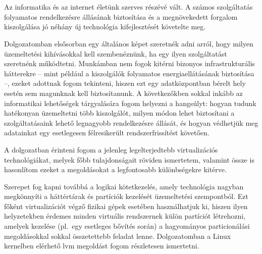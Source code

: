\chapter{\bevezetes}

%

Az informatika és az internet életünk szerves részévé vált. A számos szolgáltatás folyamatos rendelkezésre állásának biztosítása és a megnövekedett forgalom kiszolgálása jó néhány új technológia kifejlesztését követelte meg.

Dolgozatomban elsősorban egy általános képet szeretnék adni arról, hogy milyen üzemeltetési kihívásokkal kell szembenéznünk, ha egy ilyen szolgáltatást szeretnénk működtetni. Munkámban nem fogok kitérni bizonyos infrastrukturális hátterekre -- mint például a kiszolgálók folyamatos energiaellátásának biztosítása --, ezeket adottnak fogom tekinteni, hiszen ezt egy adatközpontban bérelt hely esetén sem magunknak kell biztosítanunk. A következőkben sokkal inkább az informatikai lehetőségek tárgyalására fogom helyezni a hangsúlyt: hogyan tudunk hatékonyan üzemeltetni több kiszolgálót, milyen módon lehet biztosítani a szolgáltatásaink lehető legnagyobb rendelkezésre állását, és hogyan védhetjük meg adatainkat egy esetlegesen félresikerült rendszerfrissítést követően.

A dolgozatban érinteni fogom a jelenleg legelterjedtebb virtualizációs technológiákat, melyek főbb tulajdonságait röviden ismertetem, valamint össze is hasonlítom ezeket a megoldásokat a legfontosabb különbségekre kitérve.

Szerepet fog kapni továbbá a logikai kötetkezelés, amely technológia nagyban megkönnyíti a háttértárak és partíciók kezelését üzemeltetési szempontból. Ezt főként virtualizációt végző fizikai gépek esetében használhatjuk ki, hiszen ilyen helyzetekben érdemes minden virtuális rendszernek külön partíciót létrehozni, amelyek kezelése (pl.~egy esetleges bővítés során) a hagyományos particionálási megoldásokkal sokkal összetettebb feladat lenne. Dolgozatomban a Linux kernelben elérhető \acrfull{lvm} megoldást fogom részletesen ismertetni. 

